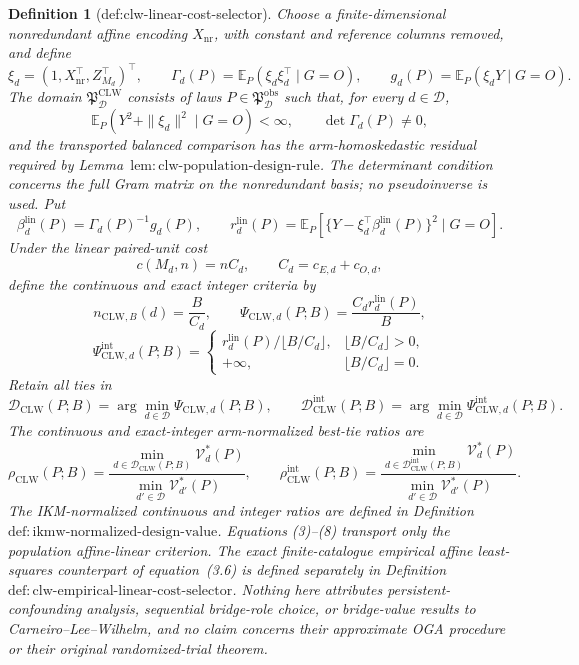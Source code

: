 \documentclass{article}
\newtheorem{definition}{Definition}
\begin{document}
\begin{definition}[def:clw-linear-cost-selector]
Choose a finite-dimensional nonredundant affine encoding \(X_{\mathrm{nr}}\), with constant and reference columns removed, and define
\[
 \xi_d=(1,X_{\mathrm{nr}}^\top,Z_{M_d}^\top)^\top,
 \qquad
 \Gamma_d(P)=\mathbb E_P(\xi_d\xi_d^\top\mid G=O),
 \qquad
 g_d(P)=\mathbb E_P(\xi_dY\mid G=O).                       \tag{1}
\]
The domain \(\mathfrak P_{\mathcal D}^{\mathrm{CLW}}\) consists of laws \(P\in\mathfrak P_{\mathcal D}^{\mathrm{obs}}\) such that, for every \(d\in\mathcal D\),
\[
 \mathbb E_P(Y^2+\|\xi_d\|^2\mid G=O)<\infty,
 \qquad \det\Gamma_d(P)\ne0,                              \tag{2}
\]
and the transported balanced comparison has the arm-homoskedastic residual required by Lemma~\(\mathrm{lem{:}clw\text{-}population\text{-}design\text{-}rule}\).  The determinant condition concerns the full Gram matrix on the nonredundant basis; no pseudoinverse is used.  Put
\[
 \beta_d^{\mathrm{lin}}(P)=\Gamma_d(P)^{-1}g_d(P),
 \qquad
 r_d^{\mathrm{lin}}(P)=
 \mathbb E_P\!\left[
 \{Y-\xi_d^\top\beta_d^{\mathrm{lin}}(P)\}^2\mid G=O
 \right].                                                   \tag{3}
\]
Under the linear paired-unit cost
\[
 c(M_d,n)=nC_d,
 \qquad C_d=c_{E,d}+c_{O,d},                                \tag{4}
\]
define the continuous and exact integer criteria by
\[
 n_{\mathrm{CLW},B}(d)=\frac{B}{C_d},
 \qquad
 \Psi_{\mathrm{CLW},d}(P;B)=\frac{C_dr_d^{\mathrm{lin}}(P)}{B}, \tag{5}
\]
\[
 \Psi_{\mathrm{CLW},d}^{\mathrm{int}}(P;B)=
 \begin{cases}
 r_d^{\mathrm{lin}}(P)/\lfloor B/C_d\rfloor,&\lfloor B/C_d\rfloor>0,\\
 +\infty,&\lfloor B/C_d\rfloor=0.
 \end{cases}                                                \tag{6}
\]
Retain all ties in
\[
 \mathcal D_{\mathrm{CLW}}(P;B)
 =\arg\min_{d\in\mathcal D}\Psi_{\mathrm{CLW},d}(P;B),
 \qquad
 \mathcal D_{\mathrm{CLW}}^{\mathrm{int}}(P;B)
 =\arg\min_{d\in\mathcal D}\Psi_{\mathrm{CLW},d}^{\mathrm{int}}(P;B). \tag{7}
\]
The continuous and exact-integer arm-normalized best-tie ratios are
\[
 \rho_{\mathrm{CLW}}(P;B)=
 \frac{\min_{d\in\mathcal D_{\mathrm{CLW}}(P;B)}\mathcal V_d^*(P)}
 {\min_{d'\in\mathcal D}\mathcal V_{d'}^*(P)},
 \qquad
 \rho_{\mathrm{CLW}}^{\mathrm{int}}(P;B)=
 \frac{\min_{d\in\mathcal D_{\mathrm{CLW}}^{\mathrm{int}}(P;B)}\mathcal V_d^*(P)}
 {\min_{d'\in\mathcal D}\mathcal V_{d'}^*(P)}.             \tag{8}
\]
The IKM-normalized continuous and integer ratios are defined in Definition~\(\mathrm{def{:}ikmw\text{-}normalized\text{-}design\text{-}value}\).  Equations (3)--(8) transport only the population affine-linear criterion.  The exact finite-catalogue empirical affine least-squares counterpart of equation~(3.6) is defined separately in Definition~\(\mathrm{def{:}clw\text{-}empirical\text{-}linear\text{-}cost\text{-}selector}\).  Nothing here attributes persistent-confounding analysis, sequential bridge-role choice, or bridge-value results to Carneiro--Lee--Wilhelm, and no claim concerns their approximate OGA procedure or their original randomized-trial theorem.

\end{definition}
\end{document}
